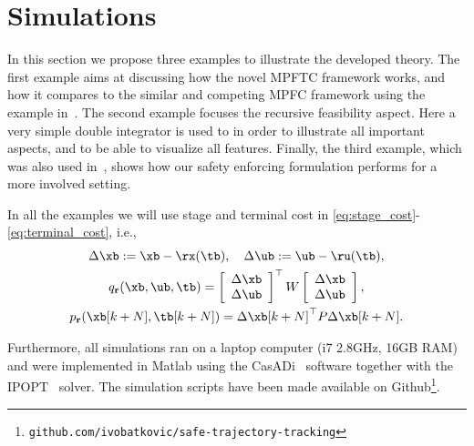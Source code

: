 \documentclass[journal]{IEEEtran}
\newcommand {\matr}[2]{\left[\begin{array}{#1}#2\end{array}\right]}
\renewcommand{\r}{{\mathbf{r}}}
\newcommand{\review}[1]{#1}
\begin{document}
	

	
	
	
	
	
	
	\section{Simulations}\label{sec:simulations}
	In this section we propose three examples to illustrate the developed theory. The first example aims at discussing how the novel MPFTC framework works, and how it compares to the similar and competing MPFC framework using the example in~\cite{Faulwasser2009}. The second example focuses the recursive feasibility aspect. Here a very simple double integrator is used to in order to illustrate all important aspects, and to be able to visualize all features. Finally, the third example, which was also used in~\cite{Faulwasser2016}, shows how our safety enforcing formulation performs for a more involved setting.
	
	In all the examples we will use stage and terminal cost in \eqref{eq:stage_cost}-\eqref{eq:terminal_cost}, i.e.,
	\begin{gather*}
	\Delta\xb := \xb-\rx(\tb),\quad \Delta\ub:=\ub-\ru(\tb), \nonumber\\
	q_\r(\xb,\ub,\tb) = \matr{c}{\Delta\xb\\\Delta\ub}^\top{}W\matr{c}{\Delta\xb\\\Delta\ub},\\
	p_\r(\xb[k+N],\tb[k+N]) = \Delta\xb[k+N]^\top{}P\Delta\xb[k+N].
	\end{gather*}
	
	Furthermore, all simulations ran on a laptop computer (i7 2.8GHz, 16GB RAM) and were implemented in Matlab using the CasADi~\cite{andersson2019casadi} software together with the IPOPT~\cite{wachter2006implementation} solver. \review{The simulation scripts have been made available on Github\footnote{{\tt \review{github.com/ivobatkovic/safe-trajectory-tracking}}}.}
	
\end{document}
